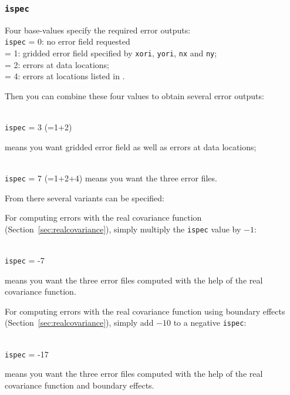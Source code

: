                       
\subsubsection{\texttt{ispec}}

Four base-values specify the required error outputs:\\

\texttt{ispec}       = 0\qquad: no error field requested\\
  = 1\qquad: gridded error field specified by \texttt{xori}, \texttt{yori}, \texttt{nx} and \texttt{ny}; \\
  = 2\qquad: errors at data locations;\\
  = 4\qquad: errors at locations listed in .

Then you can combine these four values to obtain several error outputs: 

\examples\\
\texttt{ispec}             = 3 (=1+2)\hphantom{+4} \qquad \begin{minipage}[t]{.7\textwidth}means you want gridded error field as well as errors at data locations;\end{minipage}\\ 
\texttt{ispec}             = 7 (=1+2+4) \qquad means you want the three error files.


From there several variants can be specified:

For computing errors with the real covariance function (Section~\ref{sec:realcovariance}), simply multiply the \texttt{ispec} value by $-1$:

\example\\
\texttt{ispec}             = -7 \qquad \begin{minipage}[t]{.7\textwidth}{means you want the three error files computed with the help of the real covariance function.}\end{minipage}


For computing errors with the real covariance function using boundary effects (Section~\ref{sec:realcovariance}), simply add $-10$ to a negative \texttt{ispec}:

\example\\
\texttt{ispec}             = -17 \qquad \begin{minipage}[t]{.7\textwidth}{means you want the three error files computed with the help of the real covariance function and boundary effects.}\end{minipage}


